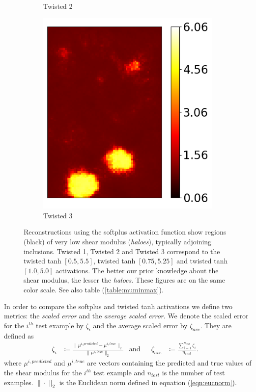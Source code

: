 \documentclass[12pt]{article}
\newcommand{\nhghaloesheight}{3.7cm}
\newcommand{\nhghaloeswidth}{0.19\linewidth}
\begin{document}
\begin{figure}[!h]
\begin{subfigure}[c]{\nhghaloeswidth}
    \caption{\label{fig:haloes_tanhp25} Twisted 2}        
  \end{subfigure}
  \begin{subfigure}[c]{\nhghaloeswidth}
    \centering
    \includegraphics[totalheight=\nhghaloesheight]{Figures/softplus_halos_new/ex1_hot/mutanhshift0.png}
    \caption{\label{fig:haloes_tanhp0} Twisted 3}    
  \end{subfigure}     
  \caption{\label{fig:haloes} Reconstructions using the softplus activation function show regions (black) of very low shear modulus (\textit{haloes}), typically adjoining inclusions. Twisted 1, Twisted 2 and Twisted 3 correspond to the twisted tanh $[0.5, 5.5]$, twisted tanh $[0.75,5.25]$ and twisted tanh $[1.0,5.0]$ activations. The better our prior knowledge about the shear modulus, the lesser the \textit{haloes}. These figures are on the same color scale. See also table (\ref{table:muminmax}).}
\end{figure}
%
In order to compare the softplus and twisted tanh activations we define two metrics: the \textit{scaled error} and the \textit{average scaled error}. We denote the scaled error for the $i^{th}$  test example by $\zeta_{i}$ and the average scaled error by $\zeta_{ave}$. They are defined as 
  \begin{align}
  \zeta_{i} &\coloneqq \frac{\|\mu^{i,predicted} - \mu^{i,true}\|_{2}}{\|\mu^{i,true}\|_{2}} &\text{and} &&\zeta_{ave} &\coloneqq \frac{\sum_{i=1}^{n_{test}}\zeta_{i}}{n_{test}}. &\label{eqn:averagescalederror}
  \end{align}
where $\mu^{i,predicted}$ and $\mu^{i,true}$ are vectors containing the predicted and true values of the shear modulus for the $i^{th}$ test example and $n_{test}$ is the number of test examples. $\|\cdot\|_2$ is the Euclidean norm defined in equation (\ref{eqn:eucnorm}).
\end{document}
